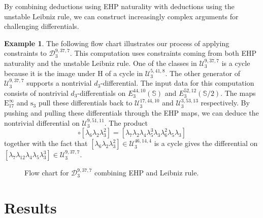 \documentclass[dvipsnames,table]{amsart}
\theoremstyle{definition}
\newtheorem{example}[theorem]{Example}
\theoremstyle{remark}
\numberwithin{equation}{section}
\newcommand{\flowchartscale}{0.8}
\begin{document}
\noindent By combining deductions using EHP naturality with deductions using the unstable Leibniz rule, we can construct increasingly complex arguments for challenging differentials.
\begin{example}
  The following flow chart illustrates our process of applying constraints to $\mathcal{D}_3^{9, 37, 7}$. This computation uses constraints coming from both EHP naturality and the unstable Leibniz rule. One of the classes in $\mathcal{U}_{3}^{9, 37, 7}$ is a cycle because it is the image under $\mathrm{H}$ of a cycle in $\mathcal{U}_3^{5, 41, 8}$. The other generator of $\mathcal{U}_3^{9, 37, 7}$ supports a nontrivial $d_3$-differential. The input data for this computation consists of nontrivial $d_3$-differentials on $E_3^{44, 10}(\mathbb{S})$ and $E_3^{52, 12}(\mathbb{S}/2)$. The maps $\mathrm{E}_{17}^{\infty}$ and $\mathrm{s}_3$ pull these differentials back to $\mathcal{U}_3^{17, 44, 10}$ and $\mathcal{U}_3^{3, 53, 13}$ respectively. By pushing and pulling these differentials through the EHP maps, we can deduce the nontrivial differential on $\mathcal{U}_3^{9, 51, 11}$. The product
  \begin{equation*}
    [\lambda_7\lambda_{12}\lambda_4\lambda_5\lambda_3^3] \circ [\lambda_6\lambda_2\lambda_3^2]
      = [\lambda_7\lambda_2\lambda_4\lambda_5^3\lambda_3\lambda_6^2\lambda_5\lambda_3]
  \end{equation*}
  together with the fact that $[\lambda_6\lambda_2\lambda_3^2] \in \mathcal{U}_3^{46, 14, 4}$ is a cycle gives the
  differential on $[\lambda_7\lambda_{12}\lambda_4\lambda_5\lambda_3^3] \in \mathcal{U}_3^{9, 37, 7}$.

\begin{figure}[!htbp]
  \centering
  {%
  \scalebox{\flowchartscale}{}}
  \caption{Flow chart for $\mathcal{D}_3^{9, 37, 7}$ combining EHP and Leibniz rule.}
  \label{fig:flowchart3}
\end{figure}
\end{example}

\clearpage

\section{Results}
\label{sec:results}
\end{document}
